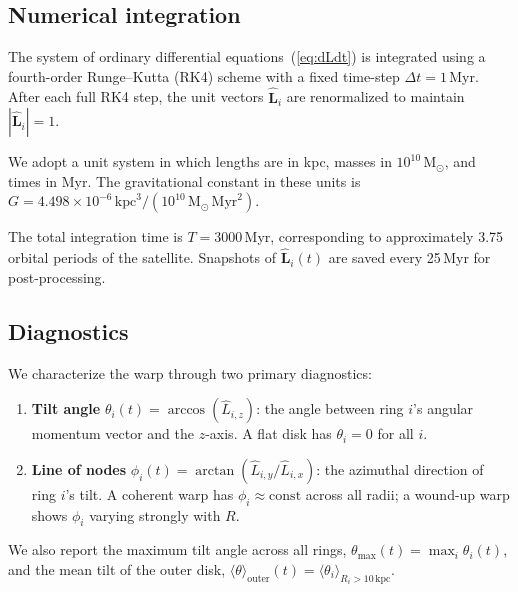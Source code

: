 \subsection{Numerical integration}
\label{sec:integration}

The system of ordinary differential equations~(\ref{eq:dLdt}) is integrated using a fourth-order Runge--Kutta (RK4) scheme with a fixed time-step $\Delta t = 1$\,Myr. After each full RK4 step, the unit vectors $\hat{\boldsymbol{L}}_i$ are renormalized to maintain $|\hat{\boldsymbol{L}}_i|=1$.

We adopt a unit system in which lengths are in kpc, masses in $10^{10}\,\mathrm{M}_\odot$, and times in Myr. The gravitational constant in these units is $G = 4.498\times10^{-6}\,\mathrm{kpc}^3/(10^{10}\,\mathrm{M}_\odot\,\mathrm{Myr}^2)$.

The total integration time is $T=3000$\,Myr, corresponding to approximately 3.75 orbital periods of the satellite. Snapshots of $\hat{\boldsymbol{L}}_i(t)$ are saved every 25\,Myr for post-processing.

\subsection{Diagnostics}
\label{sec:diagnostics}

We characterize the warp through two primary diagnostics:

\begin{enumerate}
    \item \textbf{Tilt angle} $\theta_i(t) = \arccos(\hat{L}_{i,z})$: the angle between ring $i$'s angular momentum vector and the $z$-axis. A flat disk has $\theta_i=0$ for all $i$.
    
    \item \textbf{Line of nodes} $\phi_i(t) = \arctan(\hat{L}_{i,y}/\hat{L}_{i,x})$: the azimuthal direction of ring $i$'s tilt. A coherent warp has $\phi_i \approx \mathrm{const}$ across all radii; a wound-up warp shows $\phi_i$ varying strongly with $R$.
\end{enumerate}

We also report the maximum tilt angle across all rings, $\theta_\mathrm{max}(t) = \max_i \theta_i(t)$, and the mean tilt of the outer disk, $\langle\theta\rangle_\mathrm{outer}(t) = \langle\theta_i\rangle_{R_i>10\,\mathrm{kpc}}$.

